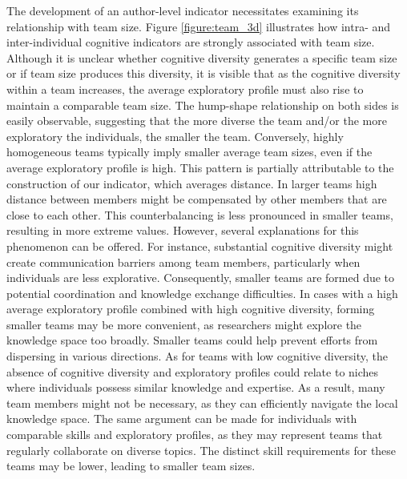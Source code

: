 The development of an author-level indicator necessitates examining its relationship with team size. Figure \ref{figure:team_3d} illustrates how intra- and inter-individual cognitive indicators are strongly associated with team size. Although it is unclear whether cognitive diversity generates a specific team size or if team size produces this diversity, it is visible that as the cognitive diversity within a team increases, the average exploratory profile must also rise to maintain a comparable team size. The hump-shape relationship on both sides is easily observable, suggesting that the more diverse the team and/or the more exploratory the individuals, the smaller the team. Conversely, highly homogeneous teams typically imply smaller average team sizes, even if the average exploratory profile is high. This pattern is partially attributable to the construction of our indicator, which averages distance. In larger teams high distance between members might be compensated by other members that are close to each other. This counterbalancing is less pronounced in smaller teams, resulting in more extreme values. However, several explanations for this phenomenon can be offered. For instance, substantial cognitive diversity might create communication barriers among team members, particularly when individuals are less explorative. Consequently, smaller teams are formed due to potential coordination and knowledge exchange difficulties. In cases with a high average exploratory profile combined with high cognitive diversity, forming smaller teams may be more convenient, as researchers might explore the knowledge space too broadly. Smaller teams could help prevent efforts from dispersing in various directions. As for teams with low cognitive diversity, the absence of cognitive diversity and exploratory profiles could relate to niches where individuals possess similar knowledge and expertise. As a result, many team members might not be necessary, as they can efficiently navigate the local knowledge space. The same argument can be made for individuals with comparable skills and exploratory profiles, as they may represent teams that regularly collaborate on diverse topics. The distinct skill requirements for these teams may be lower, leading to smaller team sizes.


